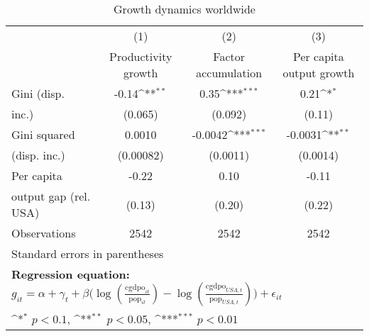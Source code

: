 \begin{sidewaystable}[htbp]\centering
\def\sym#1{\ifmmode^{#1}\else\(^{#1}\)\fi}
\caption{Growth dynamics worldwide}
\begin{tabular}{l*{3}{c}}
\hline\hline
                &\multicolumn{1}{c}{(1)}&\multicolumn{1}{c}{(2)}&\multicolumn{1}{c}{(3)}\\
                &\multicolumn{1}{c}{Productivity growth}&\multicolumn{1}{c}{Factor accumulation}&\multicolumn{1}{c}{Per capita output growth}\\
\hline
Gini (disp.     &    -0.14\sym{**} &     0.35\sym{***}&     0.21\sym{*}  \\
inc.)           &  (0.065)         &  (0.092)         &   (0.11)         \\
[1em]
Gini squared    &   0.0010         &  -0.0042\sym{***}&  -0.0031\sym{**} \\
(disp. inc.)    &(0.00082)         & (0.0011)         & (0.0014)         \\
[1em]
Per capita      &    -0.22         &     0.10         &    -0.11         \\
output gap (rel. USA)&   (0.13)         &   (0.20)         &   (0.22)         \\
\hline
Observations    &     2542         &     2542         &     2542         \\
\hline\hline
\multicolumn{4}{l}{\footnotesize Standard errors in parentheses}\\
\multicolumn{4}{l}{\footnotesize \textbf{Regression equation:} \(g_{it} = \alpha + \gamma_t + \beta \big(\log (\frac{\textrm{cgdpo}_{it}}{\textrm{pop}_{it}} ) - \log (\frac{\textrm{cgdpo}_{USA,t}}{\textrm{pop}_{USA,t}}  ) \big) + \epsilon_{it}\)}\\
\multicolumn{4}{l}{\footnotesize \sym{*} \(p<0.1\), \sym{**} \(p<0.05\), \sym{***} \(p<0.01\)}\\
\end{tabular}
\end{sidewaystable}
